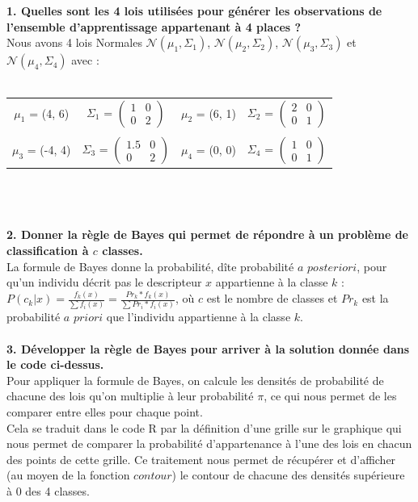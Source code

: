 \documentclass[a4paper, 10pt]{article}
\begin{document}
\textbf{1. Quelles sont les 4 lois utilisées pour générer les observations de l’ensemble d’apprentissage appartenant à 4 places ?}\\
Nous avons 4 lois Normales $\mathcal{N}(\mu_{1}, \Sigma_{1})$, $\mathcal{N}(\mu_{2}, \Sigma_{2})$, $\mathcal{N}(\mu_{3}, \Sigma_{3})$ et $\mathcal{N}(\mu_{4}, \Sigma_{4})$ avec :\\ \\
\hspace*{0.5cm}
\begin{tabular}{cccc}
$\mu_{1}$ = (4, 6) &
$\Sigma_{1}$ = $\begin{pmatrix} 1 & 0 \\ 0 & 2 \end{pmatrix}$ &
$\mu_{2}$ = (6, 1) &
$\Sigma_{2}$ = $\begin{pmatrix} 2 & 0 \\ 0 & 1 \end{pmatrix}$\\ \\
$\mu_{3}$ = (-4, 4) &
$\Sigma_{3}$ = $\begin{pmatrix} 1.5 & 0 \\ 0 & 2 \end{pmatrix}$ &
$\mu_{4}$ = (0, 0) &
$\Sigma_{4}$ = $\begin{pmatrix} 1 & 0 \\ 0 & 1 \end{pmatrix}$\\
\end{tabular}\\ \\ \\
\textbf{2. Donner la règle de Bayes qui permet de répondre à un problème de classification à $c$ classes.}\\
La formule de Bayes donne la probabilité, dîte probabilité $a$ $posteriori$, pour qu'un individu décrit pas le descripteur $x$ appartienne à la classe $k$ :
$P(c_{k}|x) = \frac{f_{k}(x)}{\sum{f_{i}(x)}} = \frac{Pr_{k} * f_{k}(x)}{\sum{}Pr_{i} * f_{i}(x)}$, où $c$ est le nombre de classes et $Pr_{k}$ est la probabilité $a$ $priori$ que l'individu appartienne à la classe $k$.\\ \\
\textbf{3. Développer la règle de Bayes pour arriver à la solution donnée dans le code ci-dessus.}\\
Pour appliquer la formule de Bayes, on calcule les densités de probabilité de chacune des lois qu'on multiplie à leur probabilité $\pi$, ce qui nous permet de les comparer entre elles pour chaque point.\\
Cela se traduit dans le code R par la définition d'une grille sur le graphique qui nous permet de comparer la probabilité d'appartenance à l'une des lois en chacun des points de cette grille. Ce traitement nous permet de récupérer et d'afficher (au moyen de la fonction $contour$) le contour de chacune des densités supérieure à 0 des 4 classes.
\end{document}
